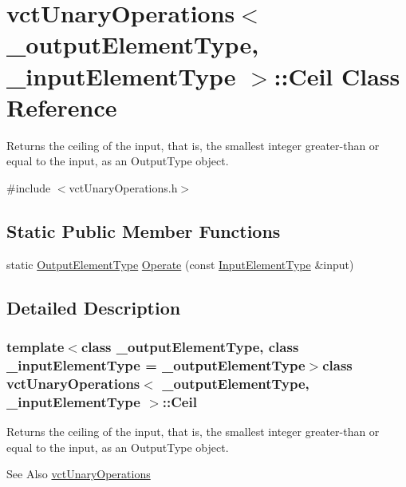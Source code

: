 \hypertarget{classvct_unary_operations_1_1_ceil}{\section{vct\-Unary\-Operations$<$ \-\_\-output\-Element\-Type, \-\_\-input\-Element\-Type $>$\-:\-:Ceil Class Reference}
\label{classvct_unary_operations_1_1_ceil}
}


Returns the ceiling of the input, that is, the smallest integer greater-\/than or equal to the input, as an Output\-Type object.  




{\ttfamily \#include $<$vct\-Unary\-Operations.\-h$>$}

\subsection*{Static Public Member Functions}
\begin{DoxyCompactItemize}
\item 
static \hyperlink{classvct_unary_operations_a42306ac3dd20d32c6d6c66ac3fa2e7b9}{Output\-Element\-Type} \hyperlink{classvct_unary_operations_1_1_ceil_a78d130b965b8fddf23d1c694d5941068}{Operate} (const \hyperlink{classvct_unary_operations_abf3b77bb7b8abd7ba72a6a45a65696a7}{Input\-Element\-Type} \&input)
\end{DoxyCompactItemize}


\subsection{Detailed Description}
\subsubsection*{template$<$class \-\_\-output\-Element\-Type, class \-\_\-input\-Element\-Type = \-\_\-output\-Element\-Type$>$class vct\-Unary\-Operations$<$ \-\_\-output\-Element\-Type, \-\_\-input\-Element\-Type $>$\-::\-Ceil}

Returns the ceiling of the input, that is, the smallest integer greater-\/than or equal to the input, as an Output\-Type object. 

\begin{DoxySeeAlso}{See Also}
\hyperlink{classvct_unary_operations}{vct\-Unary\-Operations} 
\end{DoxySeeAlso}


